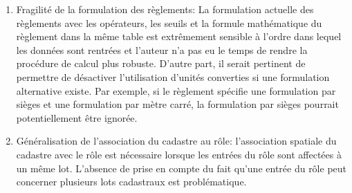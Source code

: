 \begin{enumerate}
            \item Fragilité de la formulation des règlements: La formulation actuelle des règlements avec les opérateurs, les seuils et la formule mathématique du règlement dans la même table est extrêmement sensible à l'ordre dans lequel les données sont rentrées et l'auteur n'a pas eu le temps de rendre la procédure de calcul plus robuste. D'autre part, il serait pertinent de permettre de désactiver l'utilisation d'unités converties si une formulation alternative existe. Par exemple, si le règlement spécifie une formulation par sièges et une formulation par mètre carré, la formulation par sièges pourrait potentiellement être ignorée.
            
            \item Généralisation de l'association du cadastre au rôle: l'association spatiale du cadastre avec le rôle est nécessaire lorsque les entrées du rôle sont affectées  à un même lot. L'absence de prise en compte du fait qu'une entrée du rôle peut concerner plusieurs lots cadastraux est problématique.
        \end{enumerate}

    
